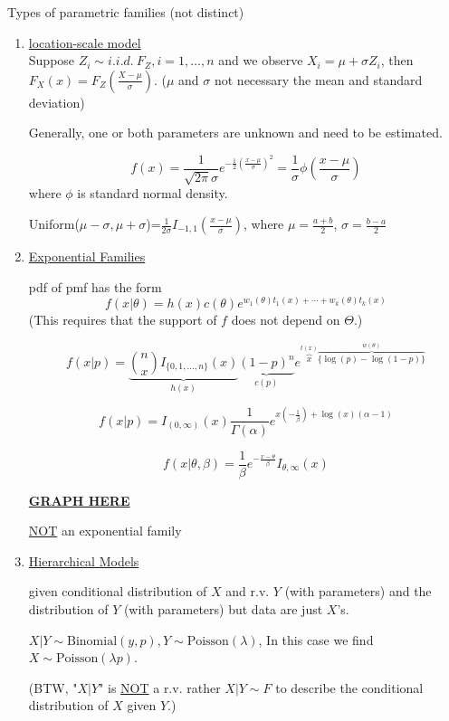 \documentclass[english, 11pt]{article}
\begin{document}
Types of parametric families (not distinct)
\begin{enumerate}[1).]
\item \underline{location-scale model}\\
Suppose $Z_i\sim i.i.d. ~F_Z, i=1, \dots, n$ and we observe $X_i=\mu+\sigma Z_i$, then $F_X(x)=F_Z\left(\frac{X-\mu}{\sigma}\right)$. ($\mu$ and $\sigma$ not necessary the mean and standard deviation)

Generally, one or both parameters are unknown and need to be estimated.
\begin{exmp}

$$
f(x)=\frac{1}{\sqrt{2\pi}\sigma}e^{-\frac{1}{2}\left(\frac{x-\mu}{\sigma}\right)^2}=\frac{1}{\sigma}\phi\left(\frac{x-\mu}{\sigma}\right)
$$
where $\phi$ is standard normal density.
\end{exmp}

\begin{exmp}[Uniform($a, b$)]
Uniform($\mu-\sigma, \mu+\sigma$)=$\frac{1}{2\sigma}I_{-1,1}\left(\frac{x-\mu}{\sigma}\right)$, where $\mu=\frac{a+b}{2}$, $\sigma=\frac{b-a}{2}$
\end{exmp}

\item \underline{Exponential Families}

pdf of pmf has the form
$$
f(x|\theta)=h(x)c(\theta)e^{w_1(\theta)t_1(x)+\cdots+w_k(\theta)t_k(x)}$$
(This requires that the support of $f$ does not  depend on $\Theta$.)
\begin{exmp}
$$
f(x|p)=\underbrace{\binom{n}{x}I_{\{0, 1, \dots, n\}}(x)}_{h(x)}\underbrace{(1-p)^n}_{c(p)}e^{\overbrace{x}^{t(x)}\overbrace{\{\log(p)-\log(1-p)\}}^{w(\theta)}}
$$
\end{exmp}
\begin{exmp}
$$
f(x|p)=I_{(0, \infty)}(x)\frac{1}{\Gamma(\alpha)}e^{x\left(-\frac{1}{\beta}\right)+\log(x)(\alpha-1)}
$$
\end{exmp}
\begin{exmp}
$$
f(x|\theta, \beta)=\frac{1}{\beta}e^{-\frac{x-\theta}{\beta}}I_{\theta, \infty}(x)
$$

\underline{\textbf{GRAPH HERE}}

\underline{NOT} an exponential family
\end{exmp}
\item \underline{Hierarchical Models}

given conditional distribution of $X$ and r.v. $Y$ (with parameters) and the distribution of $Y$ (with parameters) but data are just $X$'s.
\begin{exmp}
$X|Y\sim \text{Binomial}(y, p), Y\sim \text{Poisson}(\lambda)$, In this case we find $X\sim \text{Poisson}(\lambda p)$.

(BTW, "$X|Y$" is \underline{NOT} a r.v. rather $X|Y\sim F$ to describe the conditional distribution of $X$ given $Y$.)
\end{exmp}
\end{enumerate}
\end{document}
